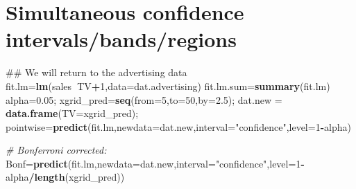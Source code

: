 \documentclass[12pt,]{book}
\newenvironment{Shaded}{\begin{snugshade}}{\end{snugshade}}
\newcommand{\KeywordTok}[1]{\textcolor[rgb]{0.13,0.29,0.53}{\textbf{#1}}}
\newcommand{\DataTypeTok}[1]{\textcolor[rgb]{0.13,0.29,0.53}{#1}}
\newcommand{\DecValTok}[1]{\textcolor[rgb]{0.00,0.00,0.81}{#1}}
\newcommand{\FloatTok}[1]{\textcolor[rgb]{0.00,0.00,0.81}{#1}}
\newcommand{\StringTok}[1]{\textcolor[rgb]{0.31,0.60,0.02}{#1}}
\newcommand{\CommentTok}[1]{\textcolor[rgb]{0.56,0.35,0.01}{\textit{#1}}}
\newcommand{\OperatorTok}[1]{\textcolor[rgb]{0.81,0.36,0.00}{\textbf{#1}}}
\newcommand{\NormalTok}[1]{#1}
\begin{document}
\section{Simultaneous confidence
intervals/bands/regions}\label{simultaneous-confidence-intervalsbandsregions}

\begin{Shaded}
\begin{Highlighting}[]
\NormalTok{## We will return to the advertising data }
\NormalTok{fit.lm=}\KeywordTok{lm}\NormalTok{(sales}\OperatorTok{~}\NormalTok{TV}\OperatorTok{+}\DecValTok{1}\NormalTok{,}\DataTypeTok{data=}\NormalTok{dat.advertising)}
\NormalTok{fit.lm.sum=}\KeywordTok{summary}\NormalTok{(fit.lm)}
\NormalTok{alpha=}\FloatTok{0.05}\NormalTok{;}
\NormalTok{xgrid_pred=}\KeywordTok{seq}\NormalTok{(}\DataTypeTok{from=}\DecValTok{5}\NormalTok{,}\DataTypeTok{to=}\DecValTok{50}\NormalTok{,}\DataTypeTok{by=}\FloatTok{2.5}\NormalTok{);}
\NormalTok{dat.new =}\StringTok{ }\KeywordTok{data.frame}\NormalTok{(}\DataTypeTok{TV=}\NormalTok{xgrid_pred);}
\NormalTok{pointwise=}\KeywordTok{predict}\NormalTok{(fit.lm,}\DataTypeTok{newdata=}\NormalTok{dat.new,}\DataTypeTok{interval=}\StringTok{"confidence"}\NormalTok{,}\DataTypeTok{level=}\DecValTok{1}\OperatorTok{-}\NormalTok{alpha)}

\CommentTok{# Bonferroni corrected:}
\NormalTok{Bonf=}\KeywordTok{predict}\NormalTok{(fit.lm,}\DataTypeTok{newdata=}\NormalTok{dat.new,}\DataTypeTok{interval=}\StringTok{"confidence"}\NormalTok{,}\DataTypeTok{level=}\DecValTok{1}\OperatorTok{-}\NormalTok{alpha}\OperatorTok{/}\KeywordTok{length}\NormalTok{(xgrid_pred))}



\end{Highlighting}
\end{Shaded}
\end{document}
